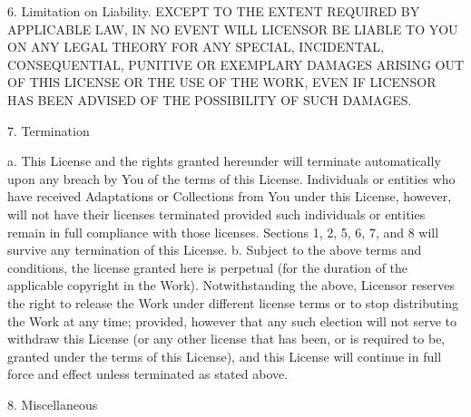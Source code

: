 6. Limitation on Liability. EXCEPT TO THE EXTENT REQUIRED BY APPLICABLE
LAW, IN NO EVENT WILL LICENSOR BE LIABLE TO YOU ON ANY LEGAL THEORY FOR
ANY SPECIAL, INCIDENTAL, CONSEQUENTIAL, PUNITIVE OR EXEMPLARY DAMAGES
ARISING OUT OF THIS LICENSE OR THE USE OF THE WORK, EVEN IF LICENSOR HAS
BEEN ADVISED OF THE POSSIBILITY OF SUCH DAMAGES.

7. Termination

 a. This License and the rights granted hereunder will terminate
    automatically upon any breach by You of the terms of this License.
    Individuals or entities who have received Adaptations or Collections
    from You under this License, however, will not have their licenses
    terminated provided such individuals or entities remain in full
    compliance with those licenses. Sections 1, 2, 5, 6, 7, and 8 will
    survive any termination of this License.
 b. Subject to the above terms and conditions, the license granted here is
    perpetual (for the duration of the applicable copyright in the Work).
    Notwithstanding the above, Licensor reserves the right to release the
    Work under different license terms or to stop distributing the Work at
    any time; provided, however that any such election will not serve to
    withdraw this License (or any other license that has been, or is
    required to be, granted under the terms of this License), and this
    License will continue in full force and effect unless terminated as
    stated above.

8. Miscellaneous

